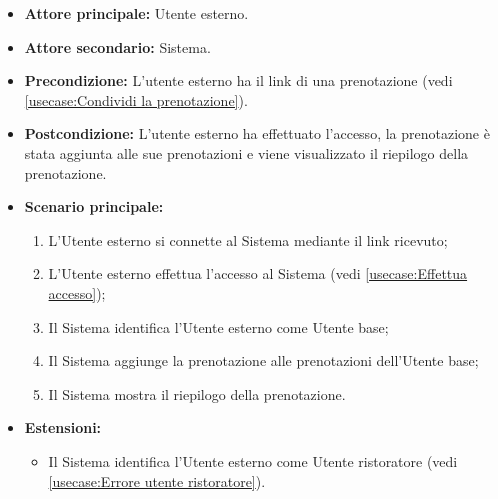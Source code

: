 \label{usecase:Accedi alla prenotazione}
\begin{itemize}
	\item \textbf{Attore principale:} Utente esterno.

	\item \textbf{Attore secondario:} Sistema.

	\item \textbf{Precondizione:} L'utente esterno ha il link di una prenotazione
	      (vedi \autoref{usecase:Condividi la prenotazione}).

	\item \textbf{Postcondizione:} L'utente esterno ha effettuato l'accesso, la
	      prenotazione è stata aggiunta alle sue prenotazioni e viene visualizzato il
	      riepilogo della prenotazione.

	\item \textbf{Scenario principale:}
	      \begin{enumerate}
		      \item L'Utente esterno si connette al Sistema mediante il link ricevuto;
		      \item L'Utente esterno effettua l'accesso al Sistema (vedi
		            \autoref{usecase:Effettua accesso});
		      \item Il Sistema identifica l'Utente esterno come Utente base;
		      \item Il Sistema aggiunge la prenotazione alle prenotazioni dell'Utente base;
		      \item Il Sistema mostra il riepilogo della prenotazione.
	      \end{enumerate}

	\item \textbf{Estensioni:}
	      \begin{itemize}
		      \item Il Sistema identifica l'Utente esterno come Utente ristoratore (vedi
		            \autoref{usecase:Errore utente ristoratore}).
	      \end{itemize}
\end{itemize}

